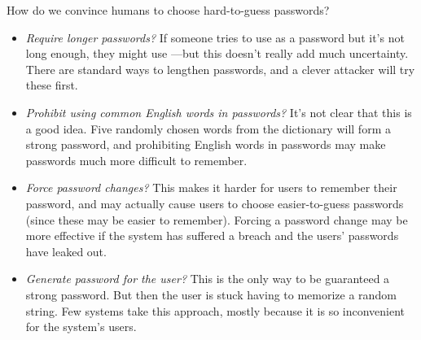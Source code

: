 
How do we convince humans to choose hard-to-guess passwords? 

\begin{itemize}
  \item \emph{Require longer passwords?} If someone tries to use 
     as a password but it's not long
    enough, they might use ---but
    this doesn't really add much uncertainty.
    There are standard ways to lengthen passwords,
    and a clever attacker will try these first.
  \item \emph{Prohibit using common English words in passwords?}
    It's not clear that this is a good idea.
    Five randomly chosen words from the dictionary will
    form a strong password, and prohibiting English words
    in passwords may make passwords much more difficult to remember.
      
  \item \emph{Force password changes?}
    This makes it harder for users to remember their password, and
    may actually cause users to choose easier-to-guess passwords
    (since these may be easier to remember).
    Forcing a password change may be more effective if the system has
    suffered a breach and the users' passwords have leaked out.

  \item \emph{Generate password for the user?} This is the only way
    to be guaranteed a strong password. But then the user is stuck
    having to memorize a random string.
    Few systems take this approach, mostly because it is so inconvenient
    for the system's users.

\end{itemize}

